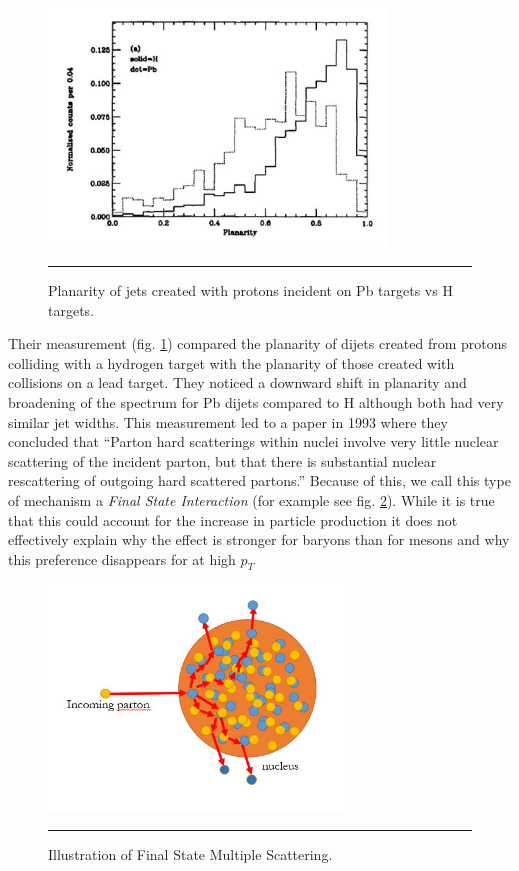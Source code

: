 \begin{figure}[htbp!]
  \centering
    \includegraphics[width=0.8\textwidth]{prevplots/e609planarity.jpg}
    \rule{35em}{0.5pt}
  \caption[Planarity of jets created with protons incident on Pb targets vs H targets.]{Planarity of jets created with protons incident on Pb targets vs H targets.}
  \label{fig:e609planarity}
\end{figure}
Their measurement (fig. \ref{fig:e609planarity}) compared the planarity of dijets created from protons colliding with a hydrogen target with the planarity of those created with collisions on a lead target. They noticed a downward shift in planarity and broadening of the spectrum for Pb dijets compared to H although both had very similar jet widths. This measurement led to a paper in 1993 where they concluded that “Parton hard scatterings within nuclei involve very little nuclear scattering of the incident parton, but that there is substantial nuclear rescattering of outgoing hard scattered partons.\citep{PhysRevLett.70.143}” Because of this, we call this type of mechanism a \textit{Final State Interaction} (for example see fig. \ref{fig:FSIscattering}). While it is true that this could account for the increase in particle production it does not effectively explain why the effect is stronger for baryons than for mesons and why this preference disappears for at high $p_{T}$
\begin{figure}[htbp!]
  \centering
    \includegraphics[width=0.7\textwidth]{Figures/FSIscattering.jpg}
    \rule{35em}{0.5pt}
  \caption[Illustration of Final State Multiple Scattering]{Illustration of Final State Multiple Scattering.}
  \label{fig:FSIscattering}
\end{figure} 

